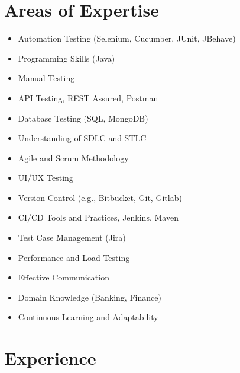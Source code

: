 \documentclass[11pt,a4paper]{article}
\begin{document}
    \section*{Areas of Expertise}
        \begin{minipage}{0.5\linewidth}
        \begin{itemize}
            \item Automation Testing (Selenium, Cucumber, JUnit, JBehave)
            \item Programming Skills (Java)
            \item Manual Testing
            \item API Testing, REST Assured, Postman
            \item Database Testing (SQL, MongoDB)
            \item Understanding of SDLC and STLC
            \item Agile and Scrum Methodology
            \item UI/UX Testing
        \end{itemize}
    \end{minipage}
    \begin{minipage}{0.5\linewidth}
        \begin{itemize}
            \item Version Control (e.g., Bitbucket, Git, Gitlab)
            \item CI/CD Tools and Practices, Jenkins, Maven
            \item Test Case Management (Jira)
            \item Performance and Load Testing
            \item Effective Communication
            \item Domain Knowledge (Banking, Finance)
            \item Continuous Learning and Adaptability
        \end{itemize}
    \end{minipage}


    \section*{Experience}
\end{document}
